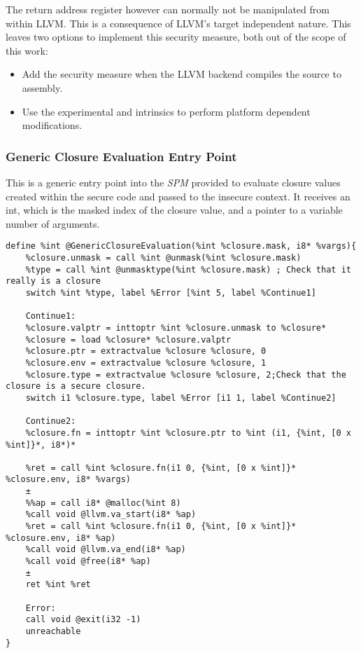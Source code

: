 The return address register however can normally not be manipulated from within LLVM. This is a consequence of LLVM's target independent nature.
This leaves two options to implement this security measure, both out of the scope of this work:
\begin{itemize}
\item 
Add the security measure when the LLVM backend compiles the \LLVMIR source to assembly.

\item 
Use the experimental  and  intrinsics to perform platform dependent modifications.
\end{itemize}


\subsubsection{Generic Closure Evaluation Entry Point}
\label{sec:genericclosureevaluationentrypoint}
This is a generic entry point into the \emph{SPM} provided to evaluate closure values created within the secure code and passed to the insecure context. It receives an int, which is the masked index of the closure value, and a pointer to a variable number of arguments.

\begin{lstlisting}
define %int @GenericClosureEvaluation(%int %closure.mask, i8* %vargs){
    %closure.unmask = call %int @unmask(%int %closure.mask)
    %type = call %int @unmasktype(%int %closure.mask) ; Check that it really is a closure
    switch %int %type, label %Error [%int 5, label %Continue1]
    
    Continue1:
    %closure.valptr = inttoptr %int %closure.unmask to %closure*
    %closure = load %closure* %closure.valptr
    %closure.ptr = extractvalue %closure %closure, 0
    %closure.env = extractvalue %closure %closure, 1
    %closure.type = extractvalue %closure %closure, 2;Check that the closure is a secure closure.
    switch i1 %closure.type, label %Error [i1 1, label %Continue2]
    
    Continue2:
    %closure.fn = inttoptr %int %closure.ptr to %int (i1, {%int, [0 x %int]}*, i8*)*
    
    %ret = call %int %closure.fn(i1 0, {%int, [0 x %int]}* %closure.env, i8* %vargs)
    ±
    %%ap = call i8* @malloc(%int 8)
    %call void @llvm.va_start(i8* %ap)
    %ret = call %int %closure.fn(i1 0, {%int, [0 x %int]}* %closure.env, i8* %ap)
    %call void @llvm.va_end(i8* %ap)
    %call void @free(i8* %ap)
    ±
    ret %int %ret
    
    Error:
    call void @exit(i32 -1)
    unreachable
}
\end{lstlisting}


